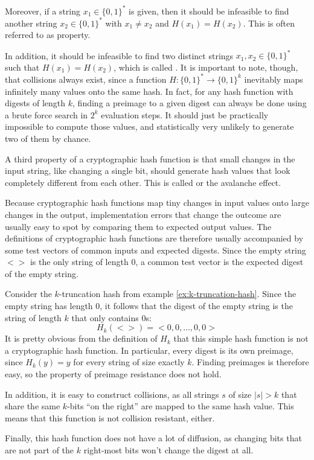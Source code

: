 Moreover, if a string $x_1\in\{0,1\}^*$ is given, then it should be infeasible to find another string $x_2\in\{0,1\}^*$ with $x_1\neq x_2$ and $H(x_1)=H(x_2)$. This is often referred to as  property.

In addition, it should be infeasible to find two distinct strings $x_1,x_2 \in\{0,1\}^*$ such that $H(x_1)=H(x_2)$, which is called . It is important to note, though, that collisions always exist, since a function $H: \{0,1\}^* \to \{0,1\}^k$ inevitably maps infinitely many values onto the same hash. In fact, for any hash function with digests of length $k$, finding a preimage to a given digest can always be done using a brute force search in $2^k$ evaluation steps. It should just be practically impossible to compute those values, and statistically very unlikely to generate two of them by chance.

A third property of a cryptographic hash function is that small changes in the input string, like changing a single bit, should generate hash values that look completely different from each other. This is called  or the avalanche effect.

Because cryptographic hash functions map tiny changes in input values onto large changes in the output, implementation errors that change the outcome are usually easy to spot by comparing them to expected output values. The definitions of cryptographic hash functions are therefore usually accompanied by some test vectors of common inputs and expected digests. Since the empty string $<>$ is the only string of length $0$, a common test vector is the expected digest of the empty string.
\begin{example} Consider the $k$-truncation hash from example \ref{ex:k-truncation-hash}. Since the empty string has length $0$, it follows that the digest of the empty string is the string of length $k$ that only contains $0$s:
\begin{equation}
H_k(<>)= <0,0,\ldots, 0,0>
\end{equation}
It is pretty obvious from the definition of $H_k$ that this simple hash function is not a cryptographic hash function. In particular, every digest is its own preimage, since $H_k(y)=y$ for every string of size exactly $k$. Finding preimages is therefore easy, so the property of preimage resistance does not hold.

In addition, it is easy to construct collisions, as all strings $s$ of size $|s|>k$ that share the same $k$-bits ``on the right'' are mapped to the same hash value. This means that this function is not collision resistant, either.

Finally, this hash function does not have a lot of diffusion, as changing bits that are not part of the $k$ right-most bits won't change the digest at all.
\end{example}

